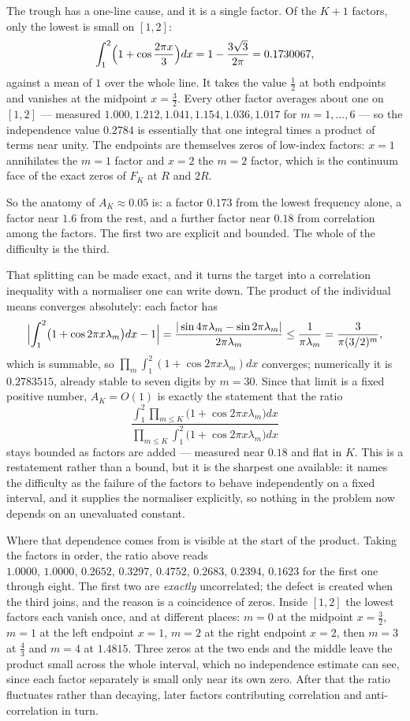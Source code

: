 \documentclass[11pt]{article}
\theoremstyle{remark}
\newcommand{\lam}{\lambda}
\begin{document}
The trough has a one-line cause, and it is a single factor. Of the $K+1$ factors, only the lowest is
small on $[1,2]$:
\[
  \int_1^2\Bigl(1+\cos\frac{2\pi x}{3}\Bigr)dx=1-\frac{3\sqrt3}{2\pi}=0.1730067,
\]
against a mean of $1$ over the whole line. It takes the value $\tfrac12$ at both endpoints and vanishes
at the midpoint $x=\tfrac32$. Every other factor averages about one on $[1,2]$ --- measured
$1.000,1.212,1.041,1.154,1.036,1.017$ for $m=1,\dots,6$ --- so the independence value $0.2784$ is
essentially that one integral times a product of terms near unity. The endpoints are themselves zeros of
low-index factors: $x=1$ annihilates the $m=1$ factor and $x=2$ the $m=2$ factor, which is the continuum
face of the exact zeros of $F_K$ at $R$ and $2R$.

So the anatomy of $A_K\approx0.05$ is: a factor $0.173$ from the lowest frequency alone, a factor near
$1.6$ from the rest, and a further factor near $0.18$ from correlation among the factors. The first two
are explicit and bounded. The whole of the difficulty is the third.

That splitting can be made exact, and it turns the target into a correlation inequality with a normaliser
one can write down. The product of the individual means converges absolutely: each factor has
\[
  \Bigl|\int_1^2\bigl(1+\cos2\pi x\lam_m\bigr)dx-1\Bigr|
  =\frac{|\sin4\pi\lam_m-\sin2\pi\lam_m|}{2\pi\lam_m}\le\frac1{\pi\lam_m}=\frac{3}{\pi(3/2)^m},
\]
which is summable, so $\prod_m\int_1^2(1+\cos2\pi x\lam_m)dx$ converges; numerically it is
$0.2783515$, already stable to seven digits by $m=30$. Since that limit is a fixed positive number,
$A_K=O(1)$ is exactly the statement that the ratio
\[
  \frac{\int_1^2\prod_{m\le K}\bigl(1+\cos2\pi x\lam_m\bigr)dx}
       {\prod_{m\le K}\int_1^2\bigl(1+\cos2\pi x\lam_m\bigr)dx}
\]
stays bounded as factors are added --- measured near $0.18$ and flat in $K$. This is a restatement rather
than a bound, but it is the sharpest one available: it names the difficulty as the failure of the factors
to behave independently on a fixed interval, and it supplies the normaliser explicitly, so nothing in the
problem now depends on an unevaluated constant.

Where that dependence comes from is visible at the start of the product. Taking the factors in order, the
ratio above reads $1.0000,\,1.0000,\,0.2652,\,0.3297,\,0.4752,\,0.2683,\,0.2394,\,0.1623$ for the first
one through eight. The first two are \emph{exactly} uncorrelated; the defect is created when the third
joins, and the reason is a coincidence of zeros. Inside $[1,2]$ the lowest factors each vanish once, and
at different places: $m=0$ at the midpoint $x=\tfrac32$, $m=1$ at the left endpoint $x=1$, $m=2$ at the
right endpoint $x=2$, then $m=3$ at $\tfrac43$ and $m=4$ at $1.4815$. Three zeros at the two ends and the
middle leave the product small across the whole interval, which no independence estimate can see, since
each factor separately is small only near its own zero. After that the ratio fluctuates rather than
decaying, later factors contributing correlation and anti-correlation in turn.
\end{document}
